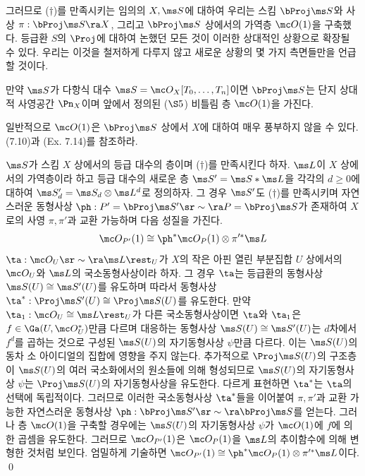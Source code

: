 	그러므로 ($\dag$)를 만족시키는 임의의 $X,\ms S$에 대하여 우리는 스킴 $\bProj\ms S$와 사상 $\pi:\bProj\ms S\ra X$,
	그리고 $\bProj\ms S$ 상에서의 가역층 $\mc O(1)$을 구축했다.
	등급환 $S$의 $\Proj$에 대하여 논했던 모든 것이 이러한 상대적인 상황으로 확장될 수 있다.
	우리는 이것을 철저하게 다루지 않고 새로운 상황의 몇 가지 측면들만을 언급할 것이다.
	
	
	\begin{example}
	만약 $\ms S$가 다항식 대수 $\ms S=\mc O_X[T_0,\ldots,T_n]$이면 $\bProj\ms S$는 단지 상대적 사영공간 $\Pn_X$이며
	앞에서 정의된 ($\S 5$) 비틀림 층 $\mc O(1)$을 가진다.
	\end{example}
	
	
	\begin{caution}
	일반적으로 $\mc O(1)$은 $\bProj\ms S$ 상에서 $X$에 대하여 매우 풍부하지 않을 수 있다. (7.10)과 (Ex. 7.14)를 참조하라.
	\end{caution}
	
	
	\begin{lemma}
	$\ms S$가 스킴 $X$ 상에서의 등급 대수의 층이며 ($\dag$)를 만족시킨다 하자.
	$\ms L$이 $X$ 상에서의 가역층이라 하고 등급 대수의 새로운 층 $\ms S'=\ms S*\ms L$을
	각각의 $d\ge 0$에 대하여 $\ms S_d'=\ms S_d\otimes\ms L^d$로 정의하자.
	그 경우 $\ms S'$도 ($\dag$)를 만족시키며 자연스러운 동형사상 $\ph:P'=\bProj\ms S'\sr\sim\ra P=\bProj\ms S$가 존재하여
	$X$로의 사영 $\pi,\pi'$과 교환 가능하며 다음 성질을 가진다.
	$$\mc O_{P'}(1)\cong\ph^*\mc O_P(1)\otimes\pi'^*\ms L$$
	\pf $\ta:\mc O_U\sr\sim\ra\ms L\rest_U$가 $X$의 작은 아핀 열린 부분집합 $U$ 상에서의
	$\mc O_U$와 $\ms L$의 국소동형사상이라 하자.
	그 경우 $\ta$는 등급환의 동형사상 $\ms S(U)\cong\ms S'(U)$를 유도하며
	따라서 동형사상 $\ta^*:\Proj\ms S'(U)\cong\Proj\ms S(U)$를 유도한다.
	만약 $\ta_1:\mc O_U\cong\ms L\rest_U$가 다른 국소동형사상이면 $\ta$와 $\ta_1$은 $f\in\Ga(U,\mc O_U^*)$만큼 다르며
	대응하는 동형사상 $\ms S(U)\cong\ms S'(U)$는 $d$차에서 $f^d$를 곱하는 것으로 구성된 $\ms S(U)$의 자기동형사상 $\psi$만큼 다르다.
	이는 $\ms S(U)$의 동차 소 아이디얼의 집합에 영향을 주지 않는다.
	추가적으로 $\Proj\ms S(U)$의 구조층이 $\ms S(U)$의 여러 국소화에서의  원소들에 의해 형성되므로
	$\ms S(U)$의 자기동형사상 $\psi$는 $\Proj\ms S(U)$의  자기동형사상을 유도한다.
	다르게 표현하면 $\ta^*$는 $\ta$의 선택에 독립적이다.
	그러므로 이러한 국소동형사상 $\ta^*$들을 이어붙여 $\pi,\pi'$과 교환 가능한
	자연스러운 동형사상 $\ph:\bProj\ms S'\sr\sim\ra\bProj\ms S$를 얻는다.
	그러나 층 $\mc O(1)$을 구축할 경우에는 $\ms S(U)$의 자기동형사상 $\psi$가 $\mc O(1)$에 $f$에 의한 곱셈을 유도한다.
	그러므로 $\mc O_{P'}(1)$은 $\mc O_P(1)$을 $\ms L$의 추이함수에 의해 변형한 것처럼 보인다.
	엄밀하게 기술하면 $\mc O_{P'}(1)\cong\ph^*\mc O_P(1)\otimes\pi'^*\ms L$이다.
	\qed
	\end{lemma}
	
